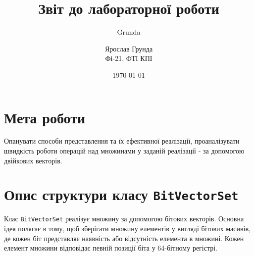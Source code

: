 \documentclass[a4paper,12pt]{article}
\author{Grunda}
\title{Звіт до лабораторної роботи}
\author{Ярослав Грунда \\ Фі-21, ФТІ КПІ}
\date{\today}
\begin{document}
\maketitle

\tableofcontents  %
\newpage

\section{Мета роботи}
Опанувати способи представлення та їх ефективної реалізації, проаналізувати швидкість роботи операцій над множинами у заданій реалізації - за допомогою двійкових векторів.

\section{Опис структури класу \texttt{BitVectorSet}}

Клас \texttt{BitVectorSet} реалізує множину за допомогою бітових векторів. Основна ідея полягає в тому, щоб зберігати множину елементів у вигляді бітових масивів, де кожен біт представляє наявність або відсутність елемента в множині. Кожен елемент множини відповідає певній позиції біта у 64-бітному регістрі.
\end{document}
